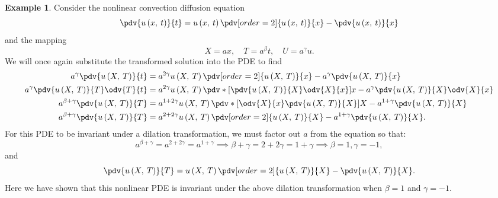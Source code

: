 \documentclass{article}
\theoremstyle{definition}
\newtheorem{example}{Example}[section]
\begin{document}
\begin{example}
    Consider the nonlinear convection diffusion equation
    \begin{equation*}
        \pdv{u\left( x,\: t \right)}{t} = u\left( x,\: t \right) \pdv[order=2]{u\left( x,\: t \right)}{x} - \pdv{u\left( x,\: t \right)}{x}
    \end{equation*}
    and the mapping
    \begin{equation*}
        X = a x, \quad T = a^\beta t, \quad U = a^\gamma u.
    \end{equation*}
    We will once again substitute the transformed solution into the PDE
    to find
    \begin{align*}
        a^\gamma \pdv{u\left( X,\: T \right)}{t}            & = a^{2\gamma} u\left( X,\: T \right) \pdv[order=2]{u\left( X,\: T \right)}{x} - a^\gamma \pdv{u\left( X,\: T \right)}{x}                                       \\
        a^\gamma \pdv{u\left( X,\: T \right)}{T} \odv{T}{t} & = a^{2\gamma} u\left( X,\: T \right) \pdv*{\left[ \pdv{u\left( X,\: T \right)}{X} \odv{X}{x} \right]}{x} - a^\gamma \pdv{u\left( X,\: T \right)}{X} \odv{X}{x} \\
        a^{\beta + \gamma} \pdv{u\left( X,\: T \right)}{T}  & = a^{1 + 2\gamma} u\left( X,\: T \right) \pdv*{\left[ \odv{X}{x} \pdv{u\left( X,\: T \right)}{X} \right]}{X} - a^{1 + \gamma} \pdv{u\left( X,\: T \right)}{X}  \\
        a^{\beta + \gamma} \pdv{u\left( X,\: T \right)}{T}  & = a^{2 + 2\gamma} u\left( X,\: T \right) \pdv[order=2]{u\left( X,\: T \right)}{X} - a^{1 + \gamma} \pdv{u\left( X,\: T \right)}{X}.
    \end{align*}
    For this PDE to be invariant under a dilation transformation, we
    must factor out \(a\) from the equation so that:
    \begin{equation*}
        a^{\beta + \gamma} = a^{2 + 2\gamma} = a^{1 + \gamma} \implies \beta + \gamma = 2 + 2\gamma = 1 + \gamma \implies \beta = 1, \gamma = -1,
    \end{equation*}
    and
    \begin{equation*}
        \pdv{u\left( X,\: T \right)}{T} = u\left( X,\: T \right) \pdv[order=2]{u\left( X,\: T \right)}{X} - \pdv{u\left( X,\: T \right)}{X}.
    \end{equation*}
    Here we have shown that this nonlinear PDE is invariant under the
    above dilation transformation when \(\beta = 1\) and \(\gamma = -1\).
\end{example}
\end{document}
